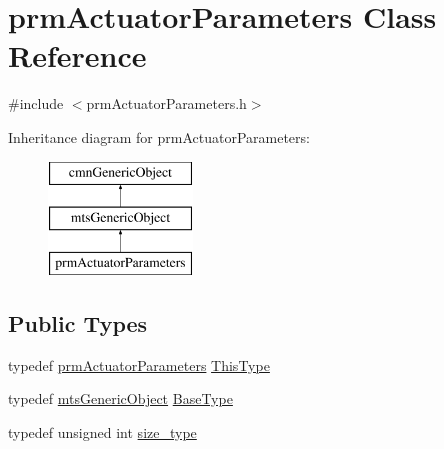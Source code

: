 \hypertarget{classprm_actuator_parameters}{}\section{prm\+Actuator\+Parameters Class Reference}
\label{classprm_actuator_parameters}


{\ttfamily \#include $<$prm\+Actuator\+Parameters.\+h$>$}

Inheritance diagram for prm\+Actuator\+Parameters\+:\begin{figure}[H]
\begin{center}
\leavevmode
\includegraphics[height=3.000000cm]{d0/d12/classprm_actuator_parameters}
\end{center}
\end{figure}
\subsection*{Public Types}
\begin{DoxyCompactItemize}
\item 
typedef \hyperlink{classprm_actuator_parameters}{prm\+Actuator\+Parameters} \hyperlink{classprm_actuator_parameters_a589f0647003ec5c96825d45d645baa49}{This\+Type}
\item 
typedef \hyperlink{classmts_generic_object}{mts\+Generic\+Object} \hyperlink{classprm_actuator_parameters_a9e63e124dcab41543b0bdcd0a652671b}{Base\+Type}
\item 
typedef unsigned int \hyperlink{classprm_actuator_parameters_a0b8bdcb6c28e1f3028d93cf9b6ca1ee0}{size\+\_\+type}
\end{DoxyCompactItemize}
